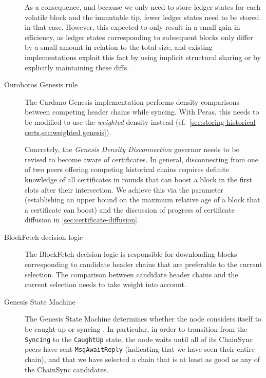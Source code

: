 \begin{description}
  As a consequence, and because we only need to store ledger states for each volatile block and the immutable tip, fewer ledger states need to be stored in that case.
  However, this expected to only result in a small gain in efficiency, as ledger states corresponding to subsequent blocks only differ by a small amount in relation to the total size, and existing implementations exploit this fact by using implicit structural sharing or by explicitly maintaining these diffs.
\item[Ouroboros Genesis rule]
  The Cardano Genesis implementation \parencite{genesis-implementation-documentation} performs density comparisons between competing header chains while syncing.
  With Peras, this needs to be modified to use the \emph{weighted} density instead (cf.~\cref{sec:storing historical certs,sec:weighted genesis}).

  Concretely, the \emph{Genesis Density Disconnection} governor needs to be revised to become aware of certificates.
  In general, disconnecting from one of two peers offering competing historical chains requires definite knowledge of all certificates in rounds that can boost a block in the first \sgen{} slots after their intersection.
  We achieve this via the \perasBlockMaxSlots{} parameter (establishing an upper bound on the maximum relative age of a block that a certificate can boost) and the discussion of progress of certificate diffusion in \cref{sec:certificate-diffusion}.
\item[BlockFetch decision logic]
  The BlockFetch decision logic is responsible for downloading blocks corresponding to candidate header chains that are preferable to the current selection.
  The comparison between candidate header chains and the current selection needs to take weight into account.
\item[Genesis State Machine]
  The Genesis State Machine determines whether the node considers itself to be caught-up or syncing \parencite{genesis-implementation-documentation}.
  In particular, in order to transition from the \texttt{Syncing} to the \texttt{CaughtUp} state, the node waits until all of its ChainSync peers have sent \texttt{MsgAwaitReply} (indicating that we have seen their entire chain), and that we have selected a chain that is at least as good as any of the ChainSync candidates.


\end{description}

